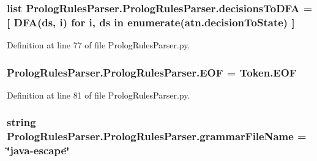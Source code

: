 \subsubsection[{decisions\+To\+D\+F\+A}]{\setlength{\rightskip}{0pt plus 5cm}list Prolog\+Rules\+Parser.\+Prolog\+Rules\+Parser.\+decisions\+To\+D\+F\+A = \mbox{[} D\+F\+A(ds, i) for i, ds in enumerate(atn.\+decision\+To\+State) \mbox{]}\hspace{0.3cm}{\ttfamily [static]}}\label{class_prolog_rules_parser_1_1_prolog_rules_parser_a61692146dafe00c2cf0d4ab5938c9c68}


Definition at line 77 of file Prolog\+Rules\+Parser.\+py.

\hypertarget{class_prolog_rules_parser_1_1_prolog_rules_parser_a4b8e8403ff8eb09e1c7b694078f765b2}{}
\subsubsection[{E\+O\+F}]{\setlength{\rightskip}{0pt plus 5cm}Prolog\+Rules\+Parser.\+Prolog\+Rules\+Parser.\+E\+O\+F = Token.\+E\+O\+F\hspace{0.3cm}{\ttfamily [static]}}\label{class_prolog_rules_parser_1_1_prolog_rules_parser_a4b8e8403ff8eb09e1c7b694078f765b2}


Definition at line 81 of file Prolog\+Rules\+Parser.\+py.

\hypertarget{class_prolog_rules_parser_1_1_prolog_rules_parser_a15377f7b025a77756d36114c83a91004}{}
\subsubsection[{grammar\+File\+Name}]{\setlength{\rightskip}{0pt plus 5cm}string Prolog\+Rules\+Parser.\+Prolog\+Rules\+Parser.\+grammar\+File\+Name = \char`\"{}java-\/escape\char`\"{}\hspace{0.3cm}{\ttfamily [static]}}\label{class_prolog_rules_parser_1_1_prolog_rules_parser_a15377f7b025a77756d36114c83a91004}


